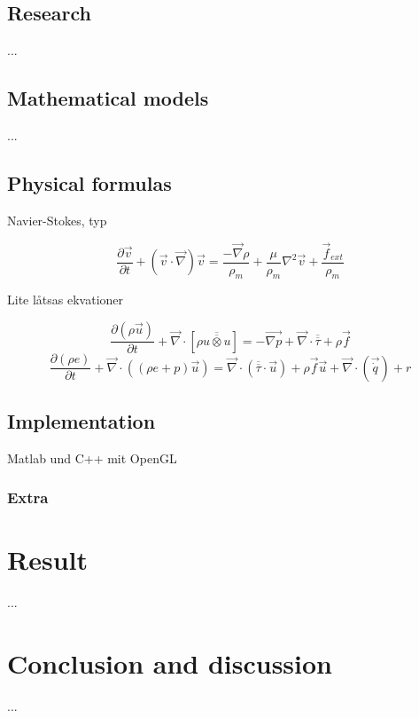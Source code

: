 \documentclass[a4paper,12pt,twoside]{report}
\begin{document}
\section{Research}

...


\section{Mathematical models}

...

\section{Physical formulas}

Navier-Stokes, typ

\begin{equation}
\frac{\partial \overrightarrow v}{\partial t} + ({\overrightarrow v}\cdot{\overrightarrow \nabla}){\overrightarrow v} = \frac{-\overrightarrow \nabla \rho}{\rho_m} + \frac{\mu}{\rho_m}{ \nabla^2}{\overrightarrow v} + \frac{\overrightarrow f_{ext}}{\rho_m} \end{equation}

Lite låtsas ekvationer

\begin{equation}
\frac{\partial(\rho \overrightarrow{u})}{\partial t} + \overrightarrow{\nabla}\cdot[\rho\overline{\overline{u\otimes u}}] = -\overrightarrow{\nabla p} + \overrightarrow{\nabla}\cdot\overline{\overline{\tau}} + \rho\overrightarrow{f} \end{equation}
\begin{equation}
\frac{\partial(\rho e)}{\partial t} + \overrightarrow{\nabla}\cdot((\rho e + p)\overrightarrow{u}) = \overrightarrow{\nabla}\cdot(\overline{\overline{\tau}}\cdot\overrightarrow{u}) + \rho\overrightarrow{f}\overrightarrow{u} + \overrightarrow{\nabla}\cdot(\overrightarrow{\dot{q}})+r \end{equation}

\newpage{}

\section{Implementation}

Matlab und C++ mit OpenGL

\subsection{Extra}

\chapter{Result}

...


\chapter{Conclusion and discussion}

...

\end{document}

